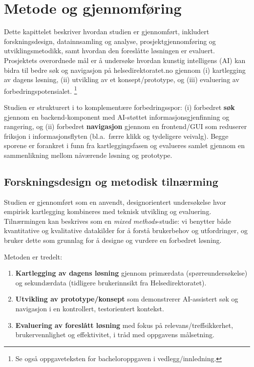 \section{Metode og gjennomføring}
\label{sec:metode}

Dette kapittelet beskriver hvordan studien er gjennomført, inkludert forskningsdesign, datainnsamling og analyse, prosjektgjennomføring og utviklingsmetodikk, samt hvordan den foreslåtte løsningen er evaluert. Prosjektets overordnede mål er å undersøke hvordan kunstig intelligens (AI) kan bidra til bedre søk og navigasjon på helsedirektoratet.no gjennom (i) kartlegging av dagens løsning, (ii) utvikling av et konsept/prototype, og (iii) evaluering av forbedringspotensialet. \cite{ProjectPlan}\footnote{Se også oppgaveteksten for bacheloroppgaven i vedlegg/innledning.}

Studien er strukturert i to komplementære forbedringsspor: (i) forbedret \textbf{søk} gjennom en backend-komponent med AI-støttet informasjonsgjenfinning og rangering, og (ii) forbedret \textbf{navigasjon} gjennom en frontend/GUI som reduserer friksjon i informasjonsflyten (bl.a.\ færre klikk og tydeligere veivalg). Begge sporene er forankret i funn fra kartleggingsfasen og evalueres samlet gjennom en sammenlikning mellom nåværende løsning og prototype.

\subsection{Forskningsdesign og metodisk tilnærming}
\label{sec:forskningsdesign}

Studien er gjennomført som en anvendt, designorientert undersøkelse hvor empirisk kartlegging kombineres med teknisk utvikling og evaluering. Tilnærmingen kan beskrives som en \textit{mixed methods}-studie: vi benytter både kvantitative og kvalitative datakilder for å forstå brukerbehov og utfordringer, og bruker dette som grunnlag for å designe og vurdere en forbedret løsning.

Metoden er tredelt:
\begin{enumerate}
    \item \textbf{Kartlegging av dagens løsning} gjennom primærdata (spørreundersøkelse) og sekundærdata (tidligere brukerinnsikt fra Helsedirektoratet).
    \item \textbf{Utvikling av prototype/konsept} som demonstrerer AI-assistert søk og navigasjon i en kontrollert, testorientert kontekst.
    \item \textbf{Evaluering av foreslått løsning} med fokus på relevans/treffsikkerhet, brukervennlighet og effektivitet, i tråd med oppgavens målsetning. \cite{ProjectPlan}
\end{enumerate}

